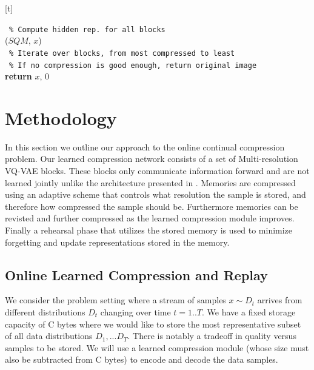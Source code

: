 \documentclass[colorinlistoftodos]{article} %
\begin{document}
\begin{minipage}{\textwidth}[t]
\begin{minipage}{0.50\textwidth}
\begin{algorithm2e}[H]
 \,\,\,\texttt{\% Compute hidden rep. for all blocks} \\
 ($SQM$, $x$)\\
\,\,\,\texttt{\% Iterate over blocks, from most compressed to least}\\
\,\,\,\texttt{\% If no compression is good enough, return original image} \\
\textbf{return} $x$, 0
\caption{}
\label{algo:adapcomp}
\end{algorithm2e}
\end{minipage}
\end{minipage}
\section{Methodology}
In this section we outline our approach to the online continual compression problem. Our learned compression network consists of a set of Multi-resolution VQ-VAE blocks. These blocks only communicate information forward and are not learned jointly unlike the architecture presented in \cite{razavi2019generating}. Memories are compressed using an adaptive scheme that controls what resolution the sample is stored, and therefore how compressed the sample should be. Furthermore memories can be revisted and further compressed as the learned compression module improves. Finally a rehearsal phase that utilizes the stored memory is used to minimize forgetting and update representations stored in the memory. 

\subsection{Online Learned Compression and Replay}
We consider the problem setting where a stream of samples $x \sim D_t$ arrives from different distributions $D_t$ changing over time $t=1..T$. We have a fixed storage capacity of C bytes where we would like to store the most representative subset of all data distributions $D_1,...D_T$. There is notably a tradeoff in quality versus samples to be stored. We will use a learned compression module (whose size must also be subtracted from C bytes) to encode and decode the data samples. 
\end{document}
